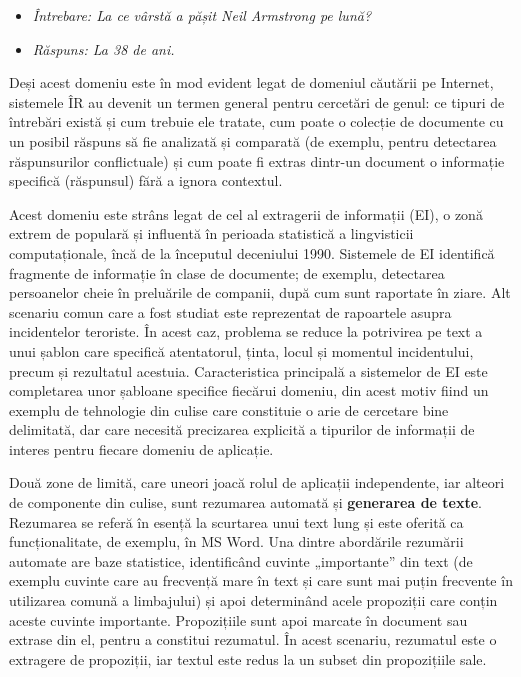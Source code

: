\begin{multicols}{2}
\begin{itemize}
\item[]\textit{Întrebare: La ce vârstă a pășit Neil Armstrong pe lună?}
\item[]\textit{Răspuns: La 38 de ani.}
\end{itemize}

Deși acest domeniu este în mod evident legat de domeniul căutării pe Internet, sistemele ÎR au devenit un termen general pentru cercetări de genul: ce tipuri de întrebări există și cum trebuie ele tratate, cum poate o colecție de documente cu un posibil răspuns să fie analizată și comparată (de exemplu, pentru detectarea răspunsurilor conflictuale) și cum poate fi extras dintr-un document o informație specifică (răspunsul) fără a ignora contextul. 

Acest domeniu este strâns legat de cel al extragerii de informații (EI), o zonă extrem de populară și influentă în perioada statistică a lingvisticii computaționale, încă de la începutul deceniului 1990. Sistemele de EI identifică fragmente de informație în clase de documente; de exemplu, detectarea persoanelor cheie în preluările de companii, după cum sunt raportate în ziare. Alt scenariu comun care a fost studiat este reprezentat de rapoartele asupra incidentelor teroriste. În acest caz, problema se reduce la potrivirea pe text a unui șablon care specifică atentatorul, ținta, locul și momentul incidentului, precum și rezultatul acestuia. Caracteristica principală a sistemelor de EI este completarea unor șabloane specifice fiecărui domeniu, din acest motiv fiind un exemplu de tehnologie din culise care constituie o arie de cercetare bine delimitată, dar care necesită precizarea explicită a tipurilor de informații de interes pentru fiecare domeniu de aplicație.

Două zone de limită, care uneori joacă rolul de aplicații independente, iar alteori de componente din culise, sunt rezumarea automată și \textbf{generarea de texte}. Rezumarea se referă în esență la scurtarea unui text lung și este oferită ca funcționalitate, de exemplu, în MS Word. Una dintre abordările rezumării automate are baze statistice, identificând cuvinte „importante” din text (de exemplu cuvinte care au frecvență mare în text și care sunt mai puțin frecvente în utilizarea comună a limbajului) și apoi determinând acele propoziții care conțin aceste cuvinte importante. Propozițiile sunt apoi marcate în document sau extrase din el, pentru a constitui rezumatul. În acest scenariu, rezumatul este o extragere de propoziții, iar textul este redus la un subset din propozițiile sale. 


\end{multicols}
